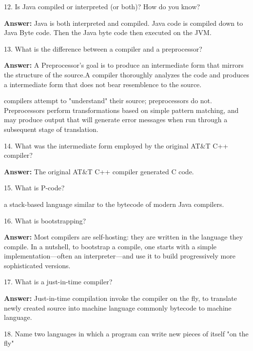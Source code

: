 \filbreak
\vskip 1cm

12. Is Java compiled or interpreted (or both)? How do you know?

\vskip 3mm

{\bf Answer:} Java is both interpreted and compiled. Java code is compiled down  to Java Byte code. Then the Java byte code then executed on the JVM.


\filbreak
\vskip 1cm

13. What is the difference between a compiler and a preprocessor?

\vskip 3mm
{\bf Answer:} A Preprocessor's goal is to produce an intermediate form that mirrors the structure of the source.A compiler thoroughly analyzes the code and produces a intermediate form that does not bear resemblence to the source.

\vskip 2mm
compilers attempt to "understand" their source; preprocessors do not. Preprocessors perform transformations based on simple pattern matching, and may produce output that will generate error messages when run through a subsequent stage of translation.

\filbreak
\vskip 1cm

14. What was the intermediate form employed by the original AT$\&$T C++ compiler?

\vskip 3mm
{\bf Answer:} The original AT$\&$T C++ compiler generated C code.


\filbreak
\vskip 1cm
15. What is P-code?

\vskip 3mm

a stack-based language similar to the bytecode of modern Java compilers.

\filbreak
\vskip 1cm

16. What is bootstrapping?

\vskip 3mm
{\bf Answer:} Most compilers are self-hosting: they are written in the language they compile. In a nutshell, to bootstrap a compile, one starts with a simple implementation---often an interpreter---and use it to build progressively more sophisticated versions.

\filbreak
\vskip 1cm
17. What is a just-in-time compiler?

\vskip 3mm
{\bf Answer:} Just-in-time compilation invoke the compiler on the fly, to translate newly created source into machine language commonly bytecode to machine language.
\filbreak
\vskip 1cm

18. Name two languages in which a program can write new pieces of itself "on the fly"

